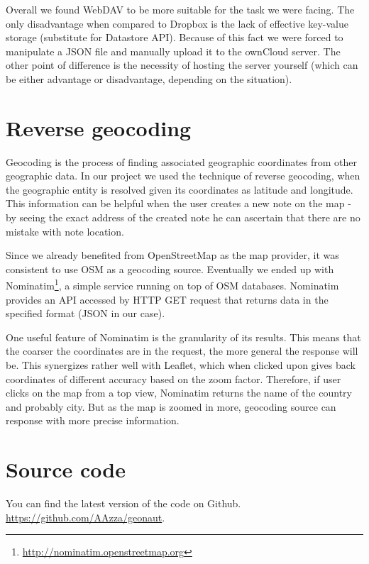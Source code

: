\documentclass[12pt,a4paper]{article}
\begin{document}
Overall we found WebDAV to be more suitable for the task we were
facing. The only disadvantage when compared to Dropbox is the lack of
effective key-value storage (substitute for Datastore API). Because of
this fact we were forced to manipulate a JSON file and manually upload
it to the ownCloud server. The other point of difference is the
necessity of hosting the server yourself (which can be either
advantage or disadvantage, depending on the situation).

\section{Reverse geocoding}

Geocoding is the process of finding associated geographic coordinates
from other geographic data. In our project we used the technique of
reverse geocoding, when the geographic entity is resolved given its
coordinates as latitude and longitude. This information can be helpful
when the user creates a new note on the map - by seeing the exact
address of the created note he can ascertain that there are no mistake
with note location.

Since we already benefited from OpenStreetMap as the map provider, it was
consistent to use OSM as a geocoding source. Eventually we ended up
with Nominatim\footnote{\url{http://nominatim.openstreetmap.org}}, a simple
service running on top of OSM databases. Nominatim provides an API
accessed by HTTP GET request that returns data in the specified format
(JSON in our case).

One useful feature of Nominatim is the granularity of its results.
This means that the coarser the coordinates are in the request, the
more general the response will be. This synergizes rather well with
Leaflet, which when clicked upon gives back coordinates of different
accuracy based on the zoom factor. Therefore, if user clicks on the
map from a top view, Nominatim returns the name of the country and
probably city. But as the map is zoomed in more, geocoding source can
response with more precise information.

\section{Source code}
    You can find the latest version of the code on Github.
    \url{https://github.com/AAzza/geonaut}.
\end{document}
